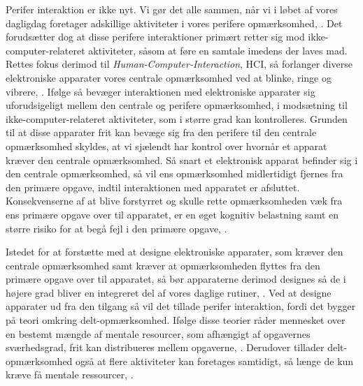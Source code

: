 Perifer interaktion er ikke nyt. Vi gør det alle sammen, når vi i løbet af vores dagligdag foretager adskillige aktiviteter i vores perifere opmærksomhed, \parencite[s. 1]{PDF:PeripheralInteraction}. Det forudsætter dog at disse perifere interaktioner primært retter sig mod ikke-computer-relateret aktiviteter, såsom at føre en samtale imedens der laves mad. Rettes fokus derimod til \textit{Human-Computer-Interaction}, HCI, så forlanger diverse elektroniske apparater vores centrale opmærksomhed ved at blinke, ringe og vibrere, \parencite[s. 1]{PDF:PeripheralInteraction}. Ifølge \textcite[s. 3]{PDF:PeripheralInteraction} så bevæger interaktionen med elektroniske apparater sig uforudsigeligt mellem den centrale og perifere opmærksomhed, i modsætning til ikke-computer-relateret aktiviteter, som i større grad kan kontrolleres. Grunden til at disse apparater frit kan bevæge sig fra den perifere til den centrale opmærksomhed skyldes, at vi sjælendt har kontrol over hvornår et apparat kræver den centrale opmærksomhed. Så snart et elektronisk apparat befinder sig i den centrale opmærksomhed, så vil ens opmærksomhed midlertidigt fjernes fra den primære opgave, indtil interaktionen med apparatet er afsluttet. Konsekvenserne af at blive forstyrret og skulle rette opmærksomheden væk fra ens primære opgave over til apparatet, er en øget kognitiv belastning samt en større risiko for at begå fejl i den primære opgave, \parencite[ss. 188-189][s. 162]{PDF:PeripheralInteraction, PDF:ComparingInputModalities}. 

Istedet for at forstætte med at designe elektroniske apparater, som kræver den centrale opmærksomhed samt kræver at opmærksomheden flyttes fra den primære opgave over til apparatet, så bør apparaterne derimod designes så de i højere grad bliver en integreret del af vores daglige rutiner, \parencite[s. 239]{PDF:PICharacteristicsAndConsiderations}. Ved at designe apparater ud fra den tilgang så vil det tillade perifer interaktion, fordi det bygger på teori omkring delt-opmærksomhed. Ifølge disse teorier råder mennesket over en bestemt mængde af mentale resourcer, som afhængigt af opgavernes sværhedsgrad, frit kan distribueres mellem opgaverne, \parencite[s. 240]{PDF:PICharacteristicsAndConsiderations}. Derudover tillader delt-opmærksomhed også at flere aktiviteter kan foretages samtidigt, så længe de kun kræve få mentale ressourcer, \parencite[s. 2]{PDF:FacilitatingPIDesignAndEvaluation}.

